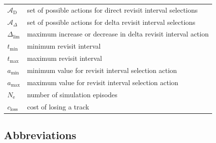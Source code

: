 \documentclass[english, 12pt, a4paper, elec, utf8, a-1b, online]{aaltothesis}
\newcommand{\amax}{a_\text{max}}
\newcommand{\amin}{a_\text{min}}
\newcommand{\Ne}{N_\text{e}}
\newcommand{\As}{\mathcal{A}}
\newcommand{\tmax}{t_\text{max}}
\newcommand{\tmin}{t_\text{min}}
\newcommand{\deltalim}{\Delta_\text{lim}}
\newcommand{\Asdir}{\As_\text{D}}
\newcommand{\Asdelta}{\As_\Delta}
\newcommand{\closs}{c_\text{loss}}
\begin{document}
\begin{longtable}{ll}
$\Asdir$ & set of possible actions for direct revisit interval selections \\
$\Asdelta$ & set of possible actions for delta revisit interval selections \\
$\deltalim$ & maximum increase or decrease in delta revisit interval action \\
$\tmin$ & minimum revisit interval \\
$\tmax$ & maximum revisit interval \\
$\amin$ & minimum value for revisit interval selection action \\
$\amax$ & maximum value for revisit interval selection action \\
$\Ne$ & number of simulation episodes \\
$\closs$ & cost of losing a track \\
\end{longtable}

\subsection*{Abbreviations}
\end{document}
